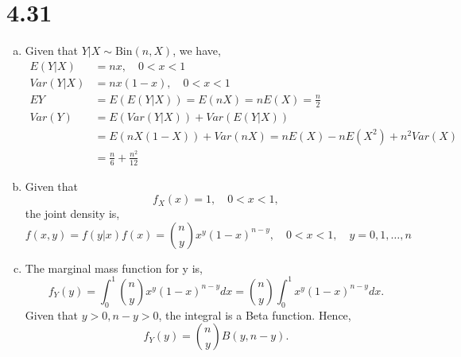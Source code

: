 \documentclass[letterpaper]{article}
\begin{document}
    \section*{4.31}
    \begin{enumerate}[(a)]
    	\item Given that $Y|X \sim \text{Bin}(n, X)$, we have,
    	\begin{align*}
    	E(Y|X) & = nx, \quad 0 < x < 1 \\
    	Var(Y|X) &= nx(1-x), \quad 0 < x < 1\\
    	EY & = E(E(Y|X)) = E(nX) = nE(X) = \frac{n}{2} \\
    	Var(Y) & = E(Var(Y|X)) + Var(E(Y|X)) \\
    	& = E(nX(1-X)) + Var(nX) = nE(X) - nE(X^2) + n^2 Var(X) \\
    	& = \frac{n}{6} + \frac{n^2}{12}
    	\end{align*}
    	\item Given that
    	\[
    	f_X(x) = 1, \quad 0 < x < 1,
    	\]
    	the joint density is,
    	\[
    	f(x, y) = f(y|x) f(x) = \binom{n}{y} x^y (1-x)^{n-y}, \quad 0 < x < 1, \quad y = 0, 1, \dots, n
    	\]
    	\item The marginal mass function for y is,
    	\[
    	f_Y(y) = \int_0^1 \binom{n}{y} x^y (1-x)^{n-y} dx = \binom{n}{y} \int_0^1 x^y (1-x)^{n-y}dx.
    	\]
    	Given that $y > 0, n-y > 0$, the integral is a Beta function. Hence,
    	\[
    	f_Y(y) = \binom{n}{y} B(y, n-y).
    	\] 
    \end{enumerate}
\end{document}
